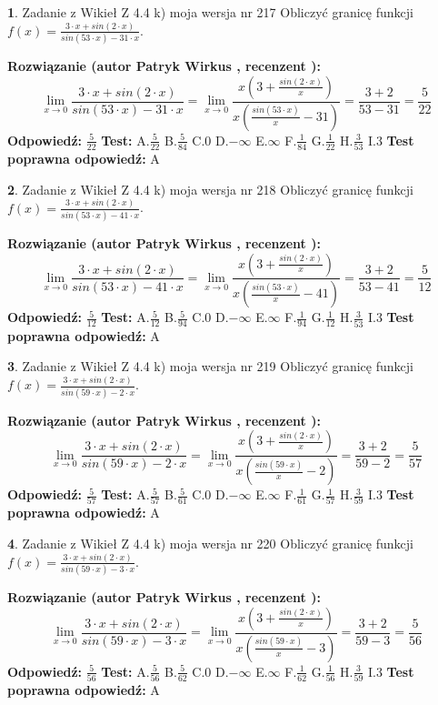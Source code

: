 \documentclass[12pt, a4paper]{article}
\theoremstyle{definition} %
\newtheorem{zad}{}
\newcommand{\zadStart}[1]{\begin{zad}#1\newline}
\newcommand{\zadStop}{\end{zad}}
\newcommand{\rozwStart}[2]{\noindent \textbf{Rozwiązanie (autor #1 , recenzent #2): }\newline}
\newcommand{\rozwStop}{\newline}
\newcommand{\odpStart}{\noindent \textbf{Odpowiedź:}\newline}
\newcommand{\odpStop}{\newline}
\newcommand{\testStart}{\noindent \textbf{Test:}\newline}
\newcommand{\testStop}{\newline}
\newcommand{\kluczStart}{\noindent \textbf{Test poprawna odpowiedź:}\newline}
\newcommand{\kluczStop}{\newline}
\begin{document}
\zadStart{Zadanie z Wikieł Z 4.4 k) moja wersja nr 217}
Obliczyć granicę funkcji $f(x)=\frac{3\cdot x +sin(2\cdot x)}{sin(53\cdot x) -31\cdot x}$.
\zadStop
\rozwStart{Patryk Wirkus}{}
$$\lim\limits_{x\to 0}\frac{3\cdot x +sin(2\cdot x)}{sin(53\cdot x) -31\cdot x}
=\lim\limits_{x\to 0}\frac{x(3+\frac{sin(2\cdot x)}{x})}{x(\frac{sin(53\cdot x)}{x}-31)}
=\frac{3+2}{53-31} = \frac{5}{22}$$
\rozwStop
\odpStart
$\frac{5}{22}$
\odpStop
\testStart
A.$\frac{5}{22}$
B.$\frac{5}{84}$
C.$0$
D.$-\infty$
E.$\infty$
F.$\frac{1}{84}$
G.$\frac{1}{22}$
H.$\frac{3}{53}$
I.$3$
\testStop
\kluczStart
A
\kluczStop



\zadStart{Zadanie z Wikieł Z 4.4 k) moja wersja nr 218}
Obliczyć granicę funkcji $f(x)=\frac{3\cdot x +sin(2\cdot x)}{sin(53\cdot x) -41\cdot x}$.
\zadStop
\rozwStart{Patryk Wirkus}{}
$$\lim\limits_{x\to 0}\frac{3\cdot x +sin(2\cdot x)}{sin(53\cdot x) -41\cdot x}
=\lim\limits_{x\to 0}\frac{x(3+\frac{sin(2\cdot x)}{x})}{x(\frac{sin(53\cdot x)}{x}-41)}
=\frac{3+2}{53-41} = \frac{5}{12}$$
\rozwStop
\odpStart
$\frac{5}{12}$
\odpStop
\testStart
A.$\frac{5}{12}$
B.$\frac{5}{94}$
C.$0$
D.$-\infty$
E.$\infty$
F.$\frac{1}{94}$
G.$\frac{1}{12}$
H.$\frac{3}{53}$
I.$3$
\testStop
\kluczStart
A
\kluczStop



\zadStart{Zadanie z Wikieł Z 4.4 k) moja wersja nr 219}
Obliczyć granicę funkcji $f(x)=\frac{3\cdot x +sin(2\cdot x)}{sin(59\cdot x) -2\cdot x}$.
\zadStop
\rozwStart{Patryk Wirkus}{}
$$\lim\limits_{x\to 0}\frac{3\cdot x +sin(2\cdot x)}{sin(59\cdot x) -2\cdot x}
=\lim\limits_{x\to 0}\frac{x(3+\frac{sin(2\cdot x)}{x})}{x(\frac{sin(59\cdot x)}{x}-2)}
=\frac{3+2}{59-2} = \frac{5}{57}$$
\rozwStop
\odpStart
$\frac{5}{57}$
\odpStop
\testStart
A.$\frac{5}{57}$
B.$\frac{5}{61}$
C.$0$
D.$-\infty$
E.$\infty$
F.$\frac{1}{61}$
G.$\frac{1}{57}$
H.$\frac{3}{59}$
I.$3$
\testStop
\kluczStart
A
\kluczStop



\zadStart{Zadanie z Wikieł Z 4.4 k) moja wersja nr 220}
Obliczyć granicę funkcji $f(x)=\frac{3\cdot x +sin(2\cdot x)}{sin(59\cdot x) -3\cdot x}$.
\zadStop
\rozwStart{Patryk Wirkus}{}
$$\lim\limits_{x\to 0}\frac{3\cdot x +sin(2\cdot x)}{sin(59\cdot x) -3\cdot x}
=\lim\limits_{x\to 0}\frac{x(3+\frac{sin(2\cdot x)}{x})}{x(\frac{sin(59\cdot x)}{x}-3)}
=\frac{3+2}{59-3} = \frac{5}{56}$$
\rozwStop
\odpStart
$\frac{5}{56}$
\odpStop
\testStart
A.$\frac{5}{56}$
B.$\frac{5}{62}$
C.$0$
D.$-\infty$
E.$\infty$
F.$\frac{1}{62}$
G.$\frac{1}{56}$
H.$\frac{3}{59}$
I.$3$
\testStop
\kluczStart
A
\kluczStop
\end{document}
